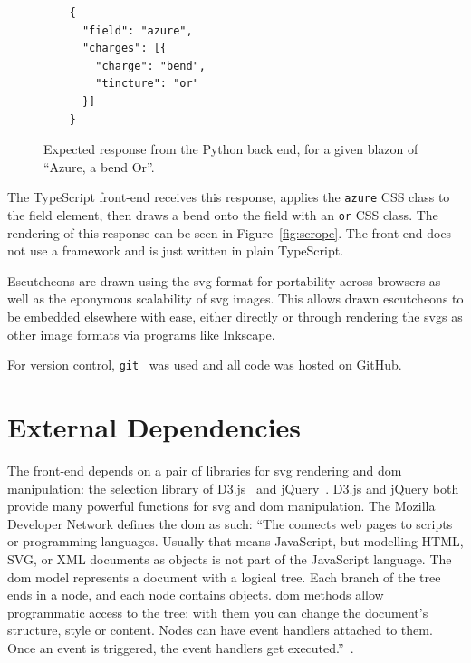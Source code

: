 \documentclass[nobib, a4paper, twoside, justified]{tufte-book}
\makeatletter
\newcommand{\svg}{\gls{svg}\@\xspace}
\newcommand{\svgs}{\glspl{svg}\@\xspace}
\newcommand{\dom}{\gls{dom}\@\xspace}
\newcommand{\blazon}{\gls{blazon}\@\xspace}
\makeatother
\begin{document}
\begin{figure}[h]
  \begin{verbatim}
    {
      "field": "azure",
      "charges": [{
        "charge": "bend",
        "tincture": "or"
      }]
    }
  \end{verbatim}
  \caption{Expected response from the Python back end, for a given \blazon of ``Azure, a bend Or''.}%
  \label{fig:expected_output}
\end{figure}

The TypeScript front-end receives this response, applies the \texttt{azure} CSS class to the field
element, then draws a bend onto the field with an \texttt{or} CSS class. The rendering of this
response can be seen in Figure~\ref{fig:scrope}. The front-end does not use a framework and is just
written in plain TypeScript.

Escutcheons are drawn using the \svg format for portability across browsers as well as the
eponymous scalability of \svg images. This allows drawn escutcheons to be embedded elsewhere with
ease, either directly or through rendering the \svgs as other image formats via programs like
Inkscape.

For version control, \texttt{git}~\autocite{git} was used and all code was hosted on GitHub.

\section{External Dependencies}%
\label{sec:external_dependencies}

The front-end depends on a pair of libraries for \svg rendering and \dom manipulation: the
selection library of D3.js~\autocite{d3js} and jQuery~\autocite{jquery}. D3.js and jQuery both
provide many powerful functions for \svg and \dom manipulation. The Mozilla Developer Network
defines the \dom as such: ``The  connects web pages to scripts or programming
languages. Usually that means JavaScript, but modelling HTML, SVG, or XML documents as objects is
not part of the JavaScript language. The \dom model represents a document with a logical tree.
Each branch of the tree ends in a node, and each node contains objects. \dom methods allow
programmatic access to the tree; with them you can change the document's structure, style or
content. Nodes can have event handlers attached to them. Once an event is triggered, the event
handlers get executed.''~\autocite{mdn_dom}.
\end{document}

